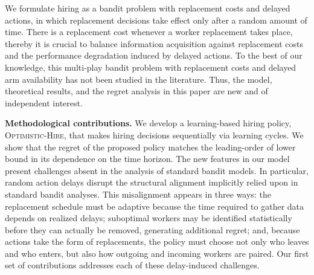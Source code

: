 \documentclass[opre,blindrev]{informs3}
\begin{document}
We formulate hiring as a bandit problem with replacement costs and delayed actions, in which replacement decisions take effect only after a random amount of time. There is a replacement cost whenever a worker replacement takes place, thereby it is crucial to balance 
information acquisition against replacement costs and the performance degradation induced by delayed actions. To the best of our knowledge, this multi-play bandit problem with replacement costs and delayed arm availability has not been studied in the literature. Thus, the model, theoretical results, and the regret analysis in this paper are new and of independent interest.



{\bf Methodological contributions.}
We develop a learning-based hiring policy, \textsc{Optimistic-Hire}, that makes hiring decisions sequentially via learning cycles. We show that the regret of the proposed policy matches the leading-order of lower bound in its dependence on the time horizon. 
The new features in our model present  
challenges absent in the analysis of standard bandit models. 
In particular, random action delays disrupt the structural alignment implicitly relied upon in standard bandit analyses. This misalignment appears in three ways: the replacement schedule must be adaptive because the time required to gather data depends on realized delays; suboptimal workers may be identified statistically before they can actually be removed, generating additional regret; and, because actions take the form of replacements, the policy must choose not only who leaves and who enters, but also how outgoing and incoming workers are paired. Our first set of contributions addresses each of these delay-induced challenges.
\end{document}
